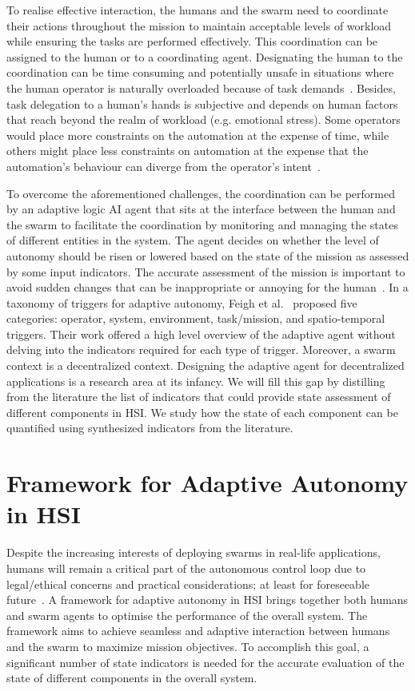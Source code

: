 \documentclass[journal]{IEEEtran}
\begin{document}
To realise effective interaction, the humans and the swarm need to coordinate their actions throughout the mission to maintain acceptable levels of workload while ensuring the tasks are performed effectively. 
This coordination can be assigned to the human or to a coordinating agent. 
Designating the human to the coordination can be time consuming and potentially unsafe in situations where the human operator is naturally overloaded because of task demands~\cite{chen2014human}. 
Besides, task delegation to a human\textquoteright s hands is subjective and depends on human factors that reach beyond the realm of workload (e.g. emotional stress). 
Some operators would place more constraints on the automation at the expense of time, while others might place less constraints on automation at the expense that the automation\textquoteright s behaviour can diverge from the operator\textquoteright s intent~\cite{miller2005playbook}. 

To overcome the aforementioned challenges, the coordination can be performed by an adaptive logic AI agent that sits at the interface between the human and the swarm to facilitate the coordination by monitoring and managing the states of different entities in the system. The agent decides on whether the level of autonomy should be risen or lowered based on the state of the mission as assessed by some input indicators. The accurate assessment of the mission is important to avoid sudden changes that can be inappropriate or annoying for the human~\cite{teaming}. In a taxonomy of triggers for adaptive autonomy, Feigh et al.~\cite{triggers} proposed  five categories: operator, system, environment, task/mission, and spatio-temporal triggers. Their work offered a high level overview of the adaptive agent without delving into the indicators required for each type of trigger. Moreover, a swarm context is a decentralized context. Designing the adaptive agent for decentralized applications is a research area at its infancy. We will fill this gap by distilling from the literature the list of indicators that could provide state assessment of different components in HSI. We study how the state of each component can be quantified using synthesized indicators from the literature.

\section{Framework for Adaptive Autonomy in HSI} \label{framework}

Despite the increasing interests of deploying swarms in real-life applications, humans will remain a critical part of the autonomous control loop due to legal/ethical concerns and practical considerations; at least for  foreseeable future~\cite{nothwang2016human}. A framework for adaptive autonomy in HSI brings together both humans and swarm agents to optimise the performance of the overall system. The framework aims to achieve seamless and adaptive interaction between humans and the swarm to maximize mission objectives. To accomplish this goal, a significant number of state indicators is needed for the accurate evaluation of the state of different components in the overall system.  
\end{document}

